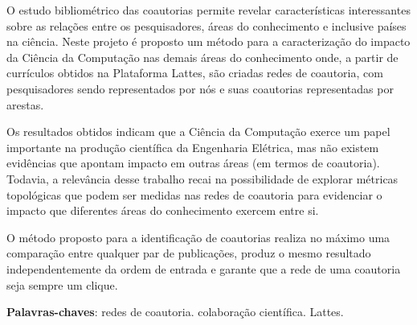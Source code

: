 
\setlength{\absparsep}{18pt} %
\begin{resumo}
    O estudo bibliométrico das coautorias permite revelar características interessantes sobre as relações entre os pesquisadores, áreas do conhecimento e inclusive países na ciência. Neste projeto é proposto um método para a caracterização do impacto da Ciência da Computação nas demais áreas do conhecimento onde, a partir de currículos obtidos na Plataforma Lattes, são criadas redes de coautoria, com pesquisadores sendo representados por nós e suas coautorias representadas por arestas.
    
    Os resultados obtidos indicam que a Ciência da Computação exerce um papel importante na produção científica da Engenharia Elétrica, mas não existem evidências que apontam impacto em outras áreas (em termos de coautoria). Todavia, a relevância desse trabalho recai na possibilidade de explorar métricas topológicas que podem ser medidas nas redes de coautoria para evidenciar o impacto que diferentes áreas do conhecimento exercem entre si.
    
    O método proposto para a identificação de coautorias realiza no máximo uma comparação entre qualquer par de publicações, produz o mesmo resultado independentemente da ordem de entrada e garante que a rede de uma coautoria seja sempre um clique.
    
    \textbf{Palavras-chaves}: redes de coautoria. colaboração científica. Lattes.
\end{resumo}
